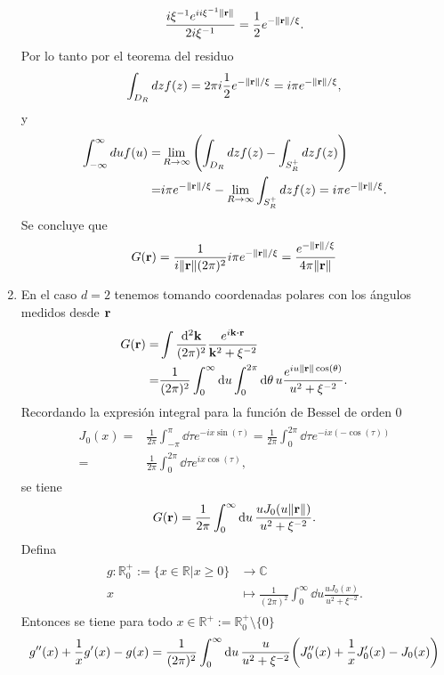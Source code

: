 \documentclass{article}
\begin{document}
\begin{enumerate}
\begin{equation}
\frac{i\xi^{-1}e^{ii\xi^{-1}\|\vb{r}\|}}{2i\xi^{-1}}=\frac{1}{2}e^{-\|\vb{r}\|/\xi}.
\end{equation}
Por lo tanto por el teorema del residuo
\begin{equation}
\int_{D_R}dzf(z)=2\pi i\frac{1}{2}e^{-\|\vb{r}\|/\xi}=i\pi e^{-\|\vb{r}\|/\xi},
\end{equation}
y
\begin{align}
\begin{split}
\int_{-\infty}^\infty duf(u)=&\lim_{R\rightarrow\infty}\qty(\int_{D_R}dzf(z)-\int_{S^+_R}dzf(z))\\
=&i\pi e^{-\|\vb{r}\|/\xi}-\lim_{R\rightarrow\infty}\int_{S^+_R}dzf(z)=i\pi e^{-\|\vb{r}\|/\xi}.
\end{split}
\end{align}
Se concluye que
\begin{equation}
G(\vb{r})=\frac{1}{i\|\vb{r}\|(2\pi)^2}i\pi e^{-\|\vb{r}\|/\xi}=\frac{e^{-\|\vb{r}\|/\xi}}{4\pi\|\vb{r}\|}
\end{equation}

\item En el caso $d=2$ tenemos tomando coordenadas polares con los ángulos medidos desde $\vb{r}$
\begin{align}
\begin{split}
G(\vb{r})=&\int\frac{\dd[2]{\vb{k}}}{(2\pi)^2}\frac{e^{i\vb{k}\vdot\vb{r}}}{\vb{k}^2+\xi^{-2}}\\
=&\frac{1}{(2\pi)^2}\int_0^\infty\dd{u}\int_0^{2\pi}\dd{\theta}u\frac{e^{iu\|\vb{r}\|\cos(\theta)}}{u^2+\xi^{-2}}.
\end{split}
\end{align}
Recordando la expresión integral para la función de Bessel de orden $0$
\begin{align}
\begin{split}
J_0(x)=&\frac{1}{2\pi}\int_{-\pi}^\pi\dd{\tau} e^{-ix\sin(\tau)}=\frac{1}{2\pi}\int_0^{2\pi}\dd{\tau} e^{-ix(-\cos(\tau))}\\
=&\frac{1}{2\pi}\int_0^{2\pi}\dd{\tau} e^{ix\cos(\tau)},
\end{split}
\end{align}
se tiene
\begin{equation}
G(\vb{r})=\frac{1}{2\pi}\int_0^\infty\dd{u}\frac{uJ_0(u\|\vb{r}\|)}{u^2+\xi^{-2}}.
\end{equation}
Defina
\begin{align}
\begin{split}
g:\mathbb{R}^+_0:=\{x\in\mathbb{R}|x\geq 0\}&\rightarrow\mathbb{C}\\
x&\mapsto\frac{1}{(2\pi)^2}\int_0^\infty\dd{u}\frac{uJ_0(x)}{u^2+\xi^{-2}}.
\end{split}
\end{align}
Entonces se tiene para todo $x\in\mathbb{R}^+:=\mathbb{R}^+_0\setminus\{0\}$
\begin{align}
\begin{split}
g''(x)+\frac{1}{x}g'(x)-g(x)=\frac{1}{(2\pi)^2}\int_0^\infty\dd{u}\frac{u}{u^2+\xi^{-2}}\qty(J_0''(x)+\frac{1}{x}J_0'(x)-J_0(x))
\end{split}
\end{align}

\end{enumerate}
\end{document}
